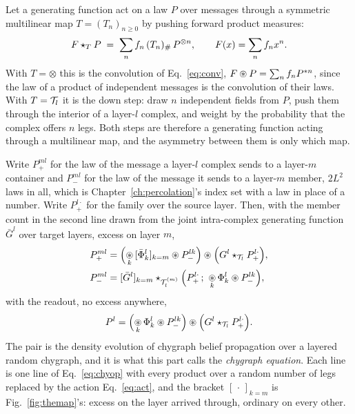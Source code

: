 Let a generating function act on a law $P$ over messages through a symmetric
multilinear map $T=(T_{n})_{n\ge0}$ by pushing forward product measures:
\begin{equation}
  F\star_{T}P\;=\;\sum_{n}f_{n}\,(T_{n})_{\#}\,P^{\otimes n},
  \qquad F(x)=\sum_{n}f_{n}x^{n}.
  \label{eq:act}
\end{equation}
With $T=\otimes$ this is the convolution of Eq.~\eqref{eq:conv},
$F\circledast P=\sum_{n}f_{n}P^{\ast n}$, since the law of a product of independent
messages is the convolution of their laws. With $T=\mathcal{T}_{l}$ it is the down
step: draw $n$ independent fields from $P$, push them through the interior of
a layer-$l$ complex, and weight by the probability that the complex offers
$n$ legs. Both steps are therefore a generating function acting through a
multilinear map, and the asymmetry between them is only which map.

Write $P^{ml}_{+}$ for the law of the message a layer-$l$ complex sends to a
layer-$m$ container and $P^{ml}_{-}$ for the law of the message it sends to a
layer-$m$ member, $2L^{2}$ laws in all, which is Chapter~\ref{ch:percolation}'s
index set with a law in place of a number. Write $P^{l\cdot}_{+}$ for the
family over the source layer. Then, with the member count in the second line
drawn from the joint intra-complex generating function $\bar G^{l}$ over
target layers, excess on layer $m$,
\begin{align}
  P^{ml}_{+} &= \Bigl(\mathop{\conv}_{k}\,[\bar\Phi^{l}_{k}]_{k=m}\conv P^{lk}_{-}\Bigr)
               \conv \Bigl(G^{l}\act{\Tint_{l}} P^{l\cdot}_{+}\Bigr),
  \label{eq:ensplus}\\
  P^{ml}_{-} &= [\bar G^{l}]_{k=m}\act{\Tint^{(m)}_{l}}
               \Bigl(P^{l\cdot}_{+}\,;\ \mathop{\conv}_{k}\Phi^{l}_{k}\conv P^{lk}_{-}\Bigr),
  \label{eq:ensminus}
\end{align}
with the readout, no excess anywhere,
\begin{equation}
  P^{l}=\Bigl(\mathop{\circledast}_{k}\Phi^{l}_{k}\circledast P^{lk}_{-}\Bigr)\circledast
        \Bigl(G^{l}\star_{\mathcal{T}_{l}}P^{l\cdot}_{+}\Bigr).
  \label{eq:ensread}
\end{equation}
The pair is the density evolution of chygraph belief propagation over a
layered random chygraph, and it is what this part calls the \emph{chygraph
equation}. Each line is one line of Eq.~\eqref{eq:chyop} with every product
over a random number of legs replaced by the action Eq.~\eqref{eq:act}, and
the bracket $[\,\cdot\,]_{k=m}$ is Fig.~\ref{fig:themap}'s: excess on the
layer arrived through, ordinary on every other.

